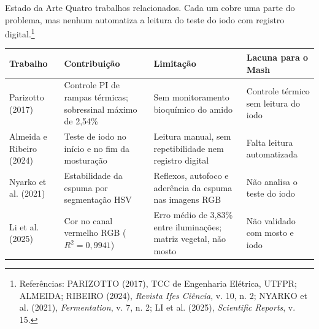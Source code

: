 \documentclass[aspectratio=169]{beamer}
\begin{document}
\begin{frame}[t]{Estado da Arte}
  \scriptsize
  Quatro trabalhos relacionados. Cada um cobre uma parte do problema, mas nenhum automatiza a leitura do teste do iodo com registro digital.\footnote{\tiny Referências: PARIZOTTO (2017), TCC de Engenharia Elétrica, UTFPR; ALMEIDA; RIBEIRO (2024), \emph{Revista Ifes Ciência}, v. 10, n. 2; NYARKO et al. (2021), \emph{Fermentation}, v. 7, n. 2; LI et al. (2025), \emph{Scientific Reports}, v. 15.}

  \vspace{0.3cm}

  \begin{center}
    \scriptsize
    \begin{tabular}{|>{\raggedright\arraybackslash}p{2.6cm}|>{\raggedright\arraybackslash}p{3.0cm}|>{\raggedright\arraybackslash}p{3.2cm}|>{\raggedright\arraybackslash}p{2.8cm}|}
      \hline
      \textbf{Trabalho} & \textbf{Contribuição} & \textbf{Limitação} & \textbf{Lacuna para o Mash} \\
      \hline
      Parizotto (2017) & Controle PI de rampas térmicas; sobressinal máximo de 2,54\% & Sem monitoramento bioquímico do amido & Controle térmico sem leitura do iodo \\
      \hline
      Almeida e Ribeiro (2024) & Teste de iodo no início e no fim da mosturação & Leitura manual, sem repetibilidade nem registro digital & Falta leitura automatizada \\
      \hline
      Nyarko et al. (2021) & Estabilidade da espuma por segmentação HSV & Reflexos, autofoco e aderência da espuma nas imagens RGB & Não analisa o teste do iodo \\
      \hline
      Li et al. (2025) & Cor no canal vermelho RGB ($R^2 = 0{,}9941$) & Erro médio de 3,83\% entre iluminações; matriz vegetal, não mosto & Não validado com mosto e iodo \\
      \hline
    \end{tabular}
  \end{center}
\end{frame}

\end{document}
